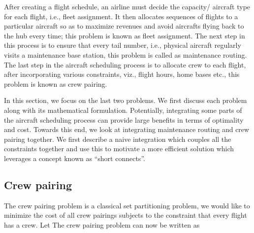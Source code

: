 \documentclass[letterpaper, 10pt, twocolumn, reqno]{amsart}
\begin{document}

After creating a flight schedule, an airline must decide the capacity/ aircraft type for each flight, i.e., fleet assignment. It then allocates sequences of flights to a particular aircraft so as to maximize revenues and avoid aircrafts flying back to the hub every time; this problem is known as fleet assignment. The next step in this process is to ensure that every tail number, i.e., physical aircraft regularly visits a maintenance base station, this problem is called as maintenance routing. The last step in the aircraft scheduling process is to allocate crew to each flight, after incorporating various constraints, viz., flight hours, home bases etc., this problem is known as crew pairing.

In this section, we focus on the last two problems. We first discuss each problem along with its mathematical formulation. Potentially, integrating some parts of the aircraft scheduling process can provide large benefits in terms of optimality and cost. Towards this end, we look at integrating maintenance routing and crew pairing together. We first describe a naive integration which couples all the constraints together and use this to motivate a more efficient solution which leverages a concept known as ``short connects''.

\subsection{Crew pairing}
\label{ssec:crew_pairing}

The crew pairing problem is a classical set partitioning problem, we would like to minimize the cost of all crew pairings subjects to the constraint that every flight has a crew. Let
The crew pairing problem can now be written as
\end{document}

